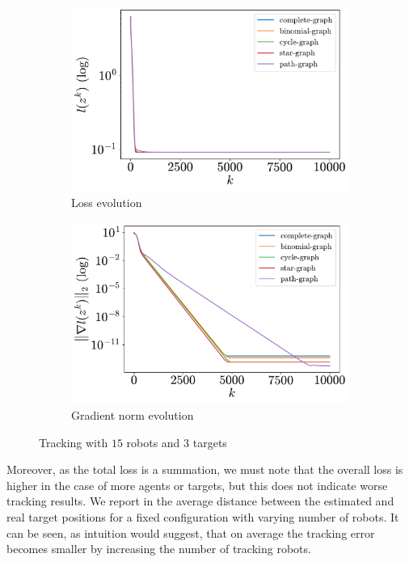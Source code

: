 \documentclass[a4paper,11pt,oneside]{book}
\begin{document}
\begin{figure}[H]
      \centering
      \begin{subfigure}[t]{0.46\linewidth}
            \centering
            \includegraphics[width=\linewidth]{./figs/tracking/15_3_2/loss.pdf} 
            \caption{Loss evolution}
      \end{subfigure}
      \hfill
      \begin{subfigure}[t]{0.46\linewidth}
            \centering
            \includegraphics[width=\linewidth]{./figs/tracking/15_3_2/gradient.pdf} 
            \caption{Gradient norm evolution}
      \end{subfigure}
      \caption{Tracking with $15$ robots and $3$ targets}
      \label{fig:tracking_15_3}
\end{figure}

Moreover, as the total loss is a summation, we must note that the overall loss is higher in the case of more agents or targets, but this does not indicate worse tracking results. We report in  the average distance between the estimated and real target positions for a fixed configuration with varying number of robots. It can be seen, as intuition would suggest, that on average the tracking error becomes smaller by increasing the number of tracking robots.
\end{document}

